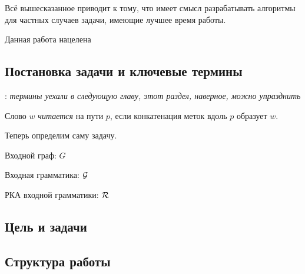  Всё вышесказанное приводит к тому, что имеет смысл разрабатывать алгоритмы для частных случаев задачи, имеющие лучшее время работы. 

 Данная работа нацелена \TODO

\subsection*{Постановка задачи и ключевые термины}

\TODO: \textit{термины уехали в следующую главу, этот раздел, наверное, можно упразднить}


\begin{definition}
Слово $w$ \textit{читается} на пути $p$, если конкатенация меток вдоль $p$ образует $w$. 
\end{definition}

Теперь определим саму задачу.

\begin{definition}
    Входной граф: $G$

    Входная грамматика: $\mathcal{G}$

    РКА входной грамматики: $\mathcal{R}$

    \TODO


\end{definition}

\subsection*{Цель и задачи}

\TODO



\subsection*{Структура работы}

\TODO